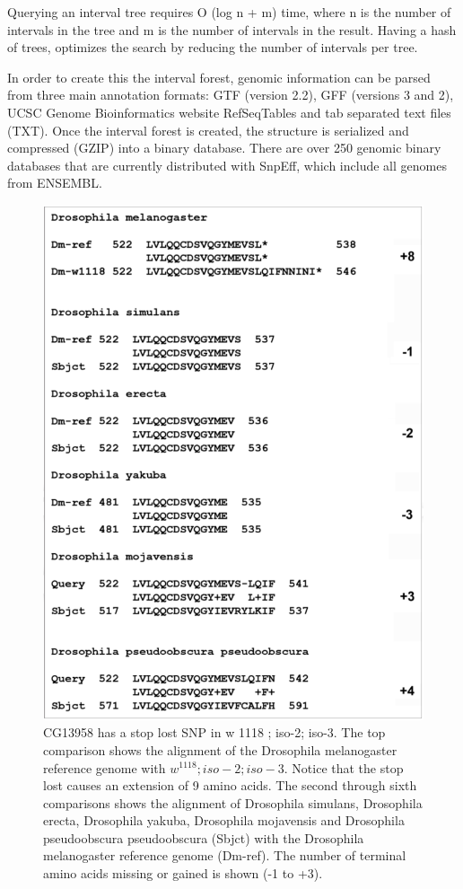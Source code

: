 Querying an interval tree requires O (log n + m) time, where n is the number of intervals in the tree and m is the number of intervals in the result. Having a hash of trees, optimizes the search by reducing the number of intervals per tree.

In order to create this the interval forest, genomic information can be parsed from three main annotation formats: GTF (version 2.2), GFF (versions 3 and 2), UCSC Genome Bioinformatics website RefSeqTables and tab separated text files (TXT). Once the interval forest is created, the structure is serialized and compressed (GZIP) into a binary database. There are over 250 genomic binary databases that are currently distributed with SnpEff, which include all genomes from ENSEMBL.

\begin{figure}
    \centering
    \includegraphics[width=14cm]{snpeff_fig5.png}
    \caption{CG13958 has a stop lost SNP in w 1118 ; iso-2; iso-3. The top comparison shows the alignment of the Drosophila melanogaster reference genome with $w^{1118} ; iso-2; iso-3$. Notice that the stop lost causes an extension of 9 amino acids. The second through sixth comparisons shows the alignment of Drosophila simulans, Drosophila erecta, Drosophila yakuba, Drosophila mojavensis and Drosophila pseudoobscura pseudoobscura (Sbjct) with the Drosophila melanogaster reference genome (Dm-ref). The number of terminal amino acids missing or gained is shown (-1 to +3). }
    \label{fig:snpeffTab3}
\end{figure}

